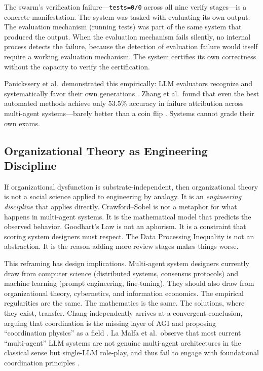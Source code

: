 \documentclass[11pt,a4paper]{article}
\begin{document}
The swarm's verification failure---\texttt{tests=0/0} across all nine verify stages---is a concrete manifestation. The system was tasked with evaluating its own output. The evaluation mechanism (running tests) was part of the same system that produced the output. When the evaluation mechanism fails silently, no internal process detects the failure, because the detection of evaluation failure would itself require a working evaluation mechanism. The system certifies its own correctness without the capacity to verify the certification.

Panickssery et al.\ demonstrated this empirically: LLM evaluators recognize and systematically favor their own generations \citep{panickssery2024}. Zhang et al.\ found that even the best automated methods achieve only 53.5\% accuracy in failure attribution across multi-agent systems---barely better than a coin flip \citep{zhang2025}. Systems cannot grade their own exams.

\subsection{Organizational Theory as Engineering Discipline}

If organizational dysfunction is substrate-independent, then organizational theory is not a social science applied to engineering by analogy. It is an \emph{engineering discipline} that applies directly. Crawford--Sobel is not a metaphor for what happens in multi-agent systems. It is the mathematical model that predicts the observed behavior. Goodhart's Law is not an aphorism. It is a constraint that scoring system designers must respect. The Data Processing Inequality is not an abstraction. It is the reason adding more review stages makes things worse.

This reframing has design implications. Multi-agent system designers currently draw from computer science (distributed systems, consensus protocols) and machine learning (prompt engineering, fine-tuning). They should also draw from organizational theory, cybernetics, and information economics. The empirical regularities are the same. The mathematics is the same. The solutions, where they exist, transfer. Chang independently arrives at a convergent conclusion, arguing that coordination is the missing layer of AGI and proposing ``coordination physics'' as a field \citep{chang2025}. La Malfa et al.\ observe that most current ``multi-agent'' LLM systems are not genuine multi-agent architectures in the classical sense but single-LLM role-play, and thus fail to engage with foundational coordination principles \citep{lamalfa2025}.
\end{document}
